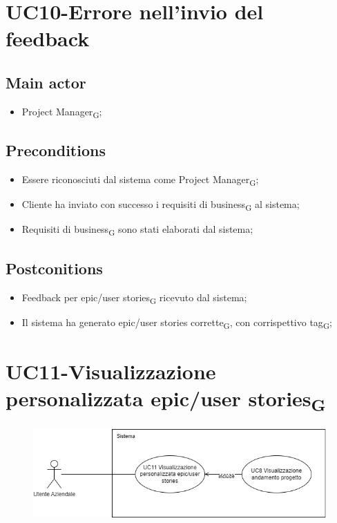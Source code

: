 \documentclass{article}
\begin{document}
\section{UC10-Errore nell'invio del feedback}

     \subsection*{Main actor}
     \begin{itemize}
         \item Project Manager\textsubscript{G};
     \end{itemize}
   \subsection*{Preconditions}
        \begin{itemize}
            \item Essere riconosciuti dal sistema come Project Manager\textsubscript{G};
            \item Cliente ha inviato con successo i requisiti di business\textsubscript{G} al sistema;
            \item Requisiti di business\textsubscript{G} sono stati elaborati dal sistema;
        \end{itemize}
        
    \subsection*{Postconitions}
        \begin{itemize}
            \item Feedback per epic/user stories\textsubscript{G} ricevuto dal sistema;
            \item Il sistema ha generato epic/user stories corrette\textsubscript{G}, con corrispettivo tag\textsubscript{G};
        \end{itemize} 

  
\section{UC11-Visualizzazione personalizzata epic/user stories\textsubscript{G}}
    \begin{figure}[h]
      \centering
      \includegraphics[width=.8\textwidth, height=.6\textheight, keepaspectratio]{./imgUML/UC11.png}
      \label{fig:immagine}
    \end{figure}
    
\end{document}
